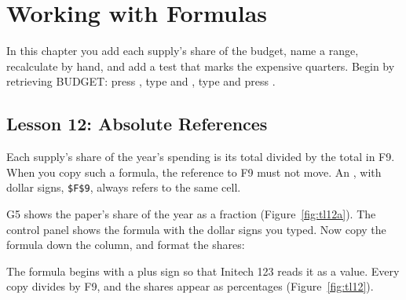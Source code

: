 \chapter{Working with Formulas}

In this chapter you add each supply's share of the budget, name a range,
recalculate by hand, and add a test that marks the expensive quarters.
Begin by retrieving BUDGET: press , type  and
, type  and press .


\section{Lesson 12: Absolute References}
Each supply's share of the year's spending is its total divided by the
total in F9.  When you copy such a formula, the reference to F9 must not
move.  An , with dollar signs, \texttt{\$F\$9},
always refers to the same cell.

\begin{Keystrokes}
\end{Keystrokes}
G5 shows the paper's share of the year as a fraction
(Figure~\ref{fig:tl12a}).  The control panel shows the formula with the
dollar signs you typed.
Now copy the formula down the column, and format the shares:
\begin{Keystrokes}
\end{Keystrokes}
The formula begins with a plus sign so that Initech 123 reads it as a
value.  Every copy divides by F9, and the shares appear as percentages
(Figure~\ref{fig:tl12}).

